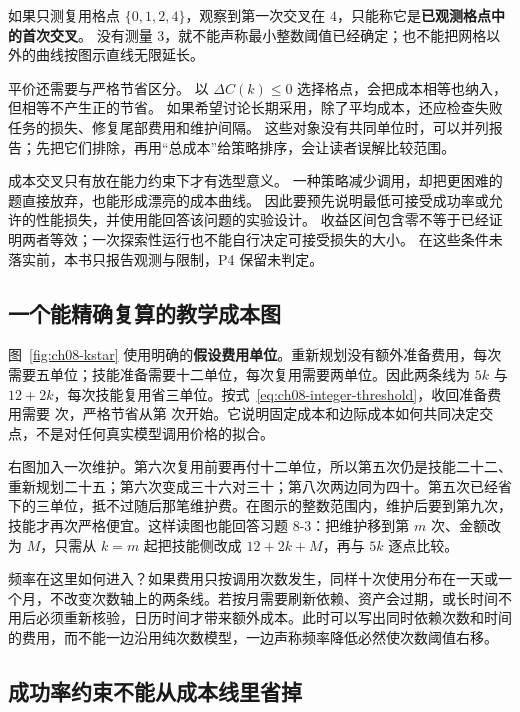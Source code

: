 如果只测复用格点 $\{0,1,2,4\}$，观察到第一次交叉在 $4$，只能称它是\textbf{已观测格点中的首次交叉}。
没有测量 $3$，就不能声称最小整数阈值已经确定；也不能把网格以外的曲线按图示直线无限延长。

平价还需要与严格节省区分。
以 $\Delta C(k)\le0$ 选择格点，会把成本相等也纳入，但相等不产生正的节省。
如果希望讨论长期采用，除了平均成本，还应检查失败任务的损失、修复尾部费用和维护间隔。
这些对象没有共同单位时，可以并列报告；先把它们排除，再用``总成本''给策略排序，会让读者误解比较范围。

成本交叉只有放在能力约束下才有选型意义。
一种策略减少调用，却把更困难的题直接放弃，也能形成漂亮的成本曲线。
因此要预先说明最低可接受成功率或允许的性能损失，并使用能回答该问题的实验设计。
收益区间包含零不等于已经证明两者等效；一次探索性运行也不能自行决定可接受损失的大小。
在这些条件未落实前，本书只报告观测与限制，P4 保留未判定。



\subsection{一个能精确复算的教学成本图}

图~\ref{fig:ch08-kstar} 使用明确的\textbf{假设费用单位}。重新规划没有额外准备费用，每次需要五单位；技能准备需要十二单位，每次复用需要两单位。因此两条线为 $5k$ 与 $12+2k$，每次技能复用省三单位。按式~\ref{eq:ch08-integer-threshold}，收回准备费用需要  次，严格节省从第  次开始。它说明固定成本和边际成本如何共同决定交点，不是对任何真实模型调用价格的拟合。

右图加入一次维护。第六次复用前要再付十二单位，所以第五次仍是技能二十二、重新规划二十五；第六次变成三十六对三十；第八次两边同为四十。第五次已经省下的三单位，抵不过随后那笔维护费。在图示的整数范围内，维护后要到第九次，技能才再次严格便宜。这样读图也能回答习题 8-3：把维护移到第 $m$ 次、金额改为 $M$，只需从 $k=m$ 起把技能侧改成 $12+2k+M$，再与 $5k$ 逐点比较。

频率在这里如何进入？如果费用只按调用次数发生，同样十次使用分布在一天或一个月，不改变次数轴上的两条线。若按月需要刷新依赖、资产会过期，或长时间不用后必须重新核验，日历时间才带来额外成本。此时可以写出同时依赖次数和时间的费用，而不能一边沿用纯次数模型，一边声称频率降低必然使次数阈值右移。

\subsection{成功率约束不能从成本线里省掉}

